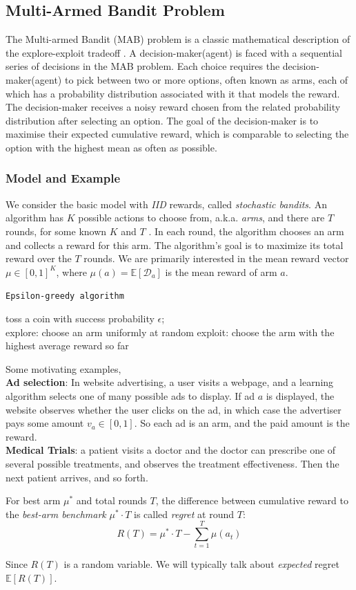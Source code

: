 \subsection{Multi-Armed Bandit Problem}
\hspace*{0.7cm}The Multi-armed Bandit (MAB) problem is a classic mathematical description of the explore-exploit tradeoff \cite{Robbins:1952}. 
A decision-maker(agent) is faced with a sequential series of decisions in the MAB problem. Each choice requires the decision-maker(agent) to pick between two or more options, often known as arms, each of which has a probability distribution associated with it that models the reward. 
The decision-maker receives a noisy reward chosen from the related probability distribution after selecting an option. The goal of the decision-maker is to maximise their expected cumulative reward, which is comparable to selecting the option with the highest mean as often as possible.

\subsubsection{Model and Example}
We consider the basic model with \textit{IID} rewards, called \textit{stochastic  bandits}\cite{mab-intro}. An algorithm has $K$ possible actions to choose from, a.k.a. \textit{arms}, and there are $T$ rounds, for some known $K$ and $T$ . In each round, the algorithm chooses an arm and collects a reward for this arm. The algorithm’s goal is to maximize its total reward over the $T$ rounds. We are primarily interested in the mean reward vector $\mu \in [0, 1]^K$, where $\mu(a) = \mathbb{E}[\mathcal{D}_a]$ is the mean reward of arm $a$.

\begin{algorithm}[H]
	\caption{\texttt{Epsilon-greedy algorithm}}
	{
		toss a coin with success probability $\epsilon$;\\
		{
			explore: choose an arm uniformly at random
		}
		{
			exploit: choose the arm with the highest average reward so far
		}
	}
\end{algorithm}
Some motivating examples,\\
\textbf{Ad selection}: In website advertising, a user visits a webpage, and a learning algorithm selects one of many possible ads to display. If ad $a$ is displayed, the website observes whether the user clicks on the ad, in which case the advertiser pays some amount $v_a \in [0, 1]$. So each ad is an arm, and the paid amount is the reward.\\
\textbf{Medical Trials}: a patient visits a doctor and the doctor can prescribe one of several possible treatments, and observes the treatment effectiveness. Then the next patient arrives, and so forth.
\begin{definition}
	For best arm $\mu^*$ and total rounds $T$, the difference between cumulative reward to the \textit{best-arm benchmark} $\mu^* \cdot T$ is called \textit{regret} at round $T$:
	$$ R(T) = \mu^* \cdot T - \sum_{t=1}^{T}\mu(a_t) $$
\end{definition}
Since $R(T)$ is a random variable. We will typically talk about \textit{expected} regret $\mathbb{E}[R(T)]$.

